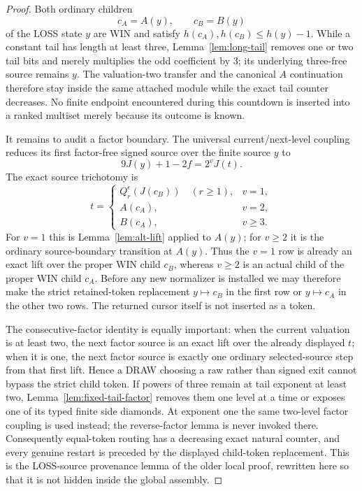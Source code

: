 \begin{proof}
Both ordinary children
\[
 c_A=A(y),\qquad c_B=B(y)
\]
of the LOSS state $y$ are WIN and satisfy
$h(c_A),h(c_B)\le h(y)-1$.  While a constant tail has length at least three,
Lemma~\ref{lem:long-tail} removes one or two tail bits and merely multiplies
the odd coefficient by $3$; its underlying three-free source remains $y$.
The valuation-two transfer and the canonical $A$ continuation therefore stay
inside the same attached module while the exact tail counter decreases.  No
finite endpoint encountered during this countdown is inserted into a ranked
multiset merely because its outcome is known.

It remains to audit a factor boundary.  The universal current/next-level
coupling reduces its first factor-free signed source over the finite source
$y$ to
\[
 9J(y)+1-2f=2^vJ(t).
\]
The exact source trichotomy is
\[
 t=\begin{cases}
   Q_r^\epsilon(J(c_B))\quad(r\ge1),&v=1,\\
   A(c_A),&v=2,\\
   B(c_A),&v\ge3.
  \end{cases}
\]
For $v=1$ this is Lemma~\ref{lem:alt-lift} applied to $A(y)$; for
$v\ge2$ it is the ordinary source-boundary transition at $A(y)$.  Thus the
$v=1$ row is already an exact lift over the proper WIN child $c_B$, whereas
$v\ge2$ is an actual child of the proper WIN child $c_A$.  Before any new
normalizer is installed we may therefore make the strict retained-token
replacement $y\mapsto c_B$ in the first row or $y\mapsto c_A$ in the other
two rows.  The returned cursor itself is not inserted as a token.

The consecutive-factor identity is equally important: when the current
valuation is at least two, the next factor source is an exact lift over the
already displayed $t$; when it is one, the next factor source is exactly one
ordinary selected-source step from that first lift.  Hence a DRAW choosing a
raw rather than signed exit cannot bypass the strict child token.  If powers
of three remain at tail exponent at least two,
Lemma~\ref{lem:fixed-tail-factor} removes them one level at a time or exposes
one of its typed finite side diamonds.  At exponent one the same two-level
factor coupling is used instead; the reverse-factor lemma is never invoked
there.  Consequently equal-token routing has a decreasing exact natural
counter, and every genuine restart is preceded by the displayed child-token
replacement.  This is the LOSS-source provenance lemma of the older local
proof, rewritten here so that it is not hidden inside the global assembly.
\end{proof}

